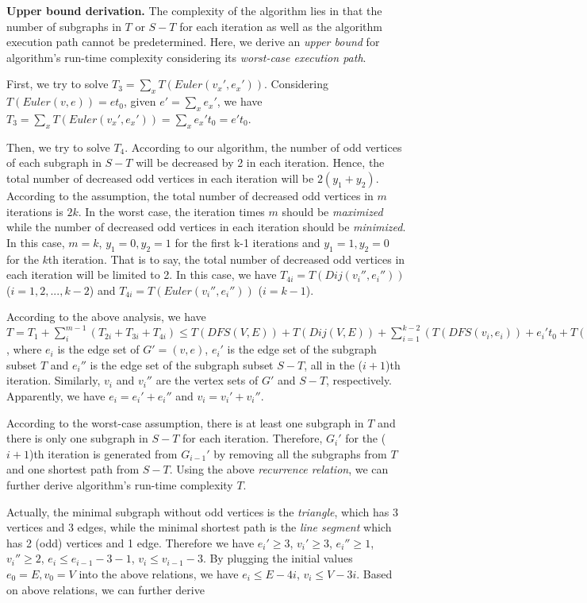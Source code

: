 \textbf{Upper bound derivation.}
The complexity of the algorithm lies in that the number of subgraphs in $T$ or $S-T$ for each iteration as well as the algorithm execution path cannot be predetermined. Here, we derive an \emph{upper bound} for algorithm's run-time complexity considering its \emph{worst-case execution path}. 

First, we try to solve $T_3 = \sum_xT(Euler(v_x',e_x'))$. Considering $T(Euler(v,e)) = et_0$, given $e' = \sum_{x}e_x'$, we have $T_3 = \sum_xT(Euler(v_x',e_x')) = \sum_{x}e_x't_0 = e't_0$.

Then, we try to solve $T_4$. According to our algorithm, the number of odd vertices of each subgraph in $S-T$ will be decreased by 2 in each iteration. Hence, the total number of decreased odd vertices in each iteration will be $2(y_1+y_2)$. According to the assumption, the total number of decreased odd vertices in $m$ iterations is $2k$. In the worst case, the iteration times $m$ should be \emph{maximized} while the number of decreased odd vertices in each iteration should be \emph{minimized}. In this case, $m = k$, $y_1 = 0, y_2 = 1$ for the first k-1 iterations and $y_1 = 1, y_2 = 0$ for the $k$th iteration. That is to say, the total number of decreased odd vertices in each iteration will be limited to 2. In this case, we have $T_{4i} = T(Dij(v_i'',e_i''))$ ($i = 1,2,...,k-2$) and $T_{4i} = T(Euler(v_i'',e_i''))$ ($i = k-1$).

According to the above analysis, we have $T = T_1 + \sum_{i}^{m-1}(T_{2i} + T_{3i} + T_{4i}) \le T(DFS(V,E)) + T(Dij(V,E)) + \sum_{i=1}^{k-2}(T(DFS(v_i,e_i)) + e_i't_0 + T(Dij(v_i'', e_i''))) + T(DFS(v_{k-1}, e_{k-1})) + e_{k-1}'t_0 + T(Euler(v_{k-1}'',e_{k-1}''))$, where $e_i$ is the edge set of $G' = (v,e)$,  $e_i'$ is the edge set of the subgraph subset $T$ and $e_i''$ is the edge set of the subgraph subset $S-T$, all in the ($i+1$)th iteration. Similarly, $v_i$ and $v_i''$ are the vertex sets of $G'$ and $S-T$, respectively. Apparently, we have $e_i = e_i' + e_i''$ and $v_i = v_i' + v_i''$.

According to the worst-case assumption, there is at least one subgraph in $T$ and there is only one subgraph in $S-T$ for each iteration. Therefore, $G_i'$ for the ($i+1$)th iteration is generated from $G_{i-1}'$ by removing all the subgraphs from $T$ and one shortest path from $S-T$. Using the above \emph{recurrence relation}, we can further derive algorithm's run-time complexity $T$. 

Actually, the minimal subgraph without odd vertices is the \emph{triangle}, which has 3 vertices and 3 edges, while the minimal shortest path is the \emph{line segment} which has 2 (odd) vertices and 1 edge. Therefore we have $e_i' \ge 3$, $v_i' \ge 3$, $e_i'' \ge 1$, $v_i'' \ge 2$, $e_i \le e_{i-1}-3-1$, $v_i \le v_{i-1} -3$. By plugging the initial values $e_0 = E, v_0 = V$ into the above relations, we have $e_i \le E-4i$, $v_i \le V - 3i$. Based on above relations, we can further derive


